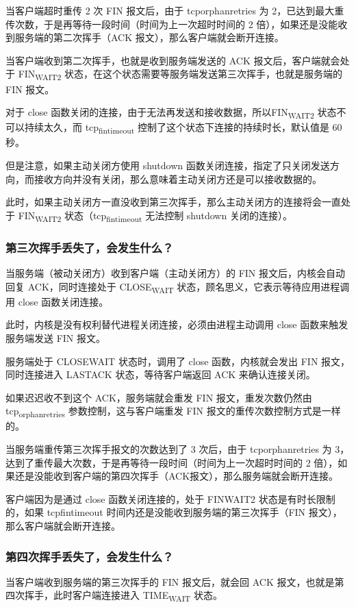 \documentclass[11pt]{article}
\begin{document}
当客户端超时重传 2 次 FIN 报文后，由于 tcporphanretries 为 2，已达到最大重传次数，于是再等待一段时间（时间为上一次超时时间的 2 倍），如果还是没能收到服务端的第二次挥手（ACK 报文），那么客户端就会断开连接。

当客户端收到第二次挥手，也就是收到服务端发送的 ACK 报文后，客户端就会处于 FIN\textsubscript{WAIT2} 状态，在这个状态需要等服务端发送第三次挥手，也就是服务端的 FIN 报文。

对于 close 函数关闭的连接，由于无法再发送和接收数据，所以FIN\textsubscript{WAIT2} 状态不可以持续太久，而 tcp\textsubscript{fin}\textsubscript{timeout} 控制了这个状态下连接的持续时长，默认值是 60 秒。

但是注意，如果主动关闭方使用 shutdown 函数关闭连接，指定了只关闭发送方向，而接收方向并没有关闭，那么意味着主动关闭方还是可以接收数据的。

此时，如果主动关闭方一直没收到第三次挥手，那么主动关闭方的连接将会一直处于 FIN\textsubscript{WAIT2} 状态（tcp\textsubscript{fin}\textsubscript{timeout} 无法控制 shutdown 关闭的连接）。
\subsubsection{第三次挥手丢失了，会发生什么？}
\label{sec:orgf7a2edf}
当服务端（被动关闭方）收到客户端（主动关闭方）的 FIN 报文后，内核会自动回复 ACK，同时连接处于 CLOSE\textsubscript{WAIT} 状态，顾名思义，它表示等待应用进程调用 close 函数关闭连接。

此时，内核是没有权利替代进程关闭连接，必须由进程主动调用 close 函数来触发服务端发送 FIN 报文。

服务端处于 CLOSEWAIT 状态时，调用了 close 函数，内核就会发出 FIN 报文，同时连接进入 LASTACK 状态，等待客户端返回 ACK 来确认连接关闭。

如果迟迟收不到这个 ACK，服务端就会重发 FIN 报文，重发次数仍然由 tcp\textsubscript{orphan}\textsubscript{retries} 参数控制，这与客户端重发 FIN 报文的重传次数控制方式是一样的。

当服务端重传第三次挥手报文的次数达到了 3 次后，由于 tcporphanretries 为 3，达到了重传最大次数，于是再等待一段时间（时间为上一次超时时间的 2 倍），如果还是没能收到客户端的第四次挥手（ACK报文），那么服务端就会断开连接。

客户端因为是通过 close 函数关闭连接的，处于 FINWAIT2 状态是有时长限制的，如果 tcpfintimeout 时间内还是没能收到服务端的第三次挥手（FIN 报文），那么客户端就会断开连接。
\subsubsection{第四次挥手丢失了，会发生什么？}
\label{sec:org1bd27d9}
当客户端收到服务端的第三次挥手的 FIN 报文后，就会回 ACK 报文，也就是第四次挥手，此时客户端连接进入 TIME\textsubscript{WAIT} 状态。
\end{document}
